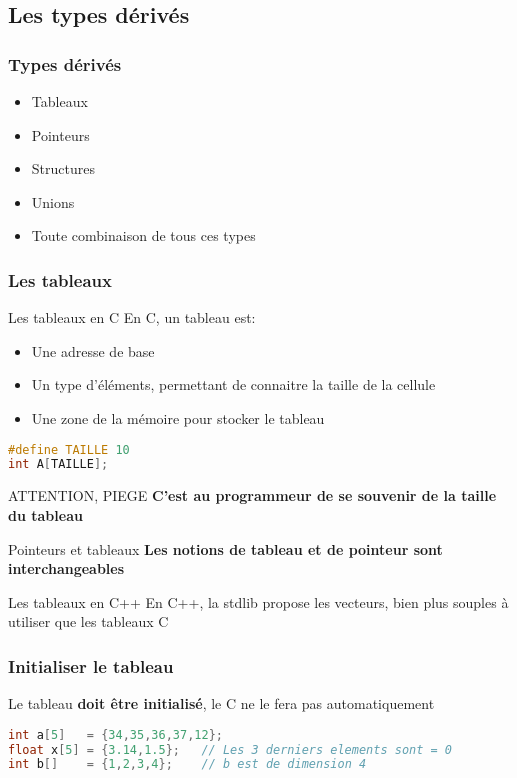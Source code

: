 \documentclass{beamer}
\begin{document}
\subsection{Les types dérivés}

\begin{frame}
\frametitle {Types dérivés}
\begin{itemize}
\item{Tableaux}
\item{Pointeurs}
\item{Structures}
\item{Unions}
\item{Toute combinaison de tous ces types}
\end{itemize}
\end{frame}

\begin{frame}[fragile=singleslide,shrink=20]
\frametitle{Les tableaux}
\begin{block}{Les tableaux en C}
En C, un tableau est:
\begin{itemize}
\item{Une adresse de base}
\item{Un type d'éléments, permettant de connaitre la taille de la cellule}
\item{Une zone de la mémoire pour stocker le tableau}
\end{itemize}
\end{block}
\begin{lstlisting}[language=c++]
#define TAILLE 10
int A[TAILLE];
\end{lstlisting}
\begin{block}{ATTENTION, PIEGE}
\textbf{C'est au programmeur de se souvenir de la taille du tableau}
\end{block}
\begin{block}{Pointeurs et tableaux}
\textbf{Les notions de tableau et de pointeur sont interchangeables}
\end{block}
\begin{block}{Les tableaux en C++}
En C++, la stdlib propose les vecteurs, bien plus souples à utiliser que les tableaux C
\end{block}
\end{frame}

\begin{frame}[fragile=singleslide,shrink=20]
\frametitle{Initialiser le tableau}
Le tableau \textbf{doit être initialisé}, le C ne le fera pas automatiquement
\begin{lstlisting}[language=c++]
int a[5]   = {34,35,36,37,12};
float x[5] = {3.14,1.5};   // Les 3 derniers elements sont = 0
int b[]    = {1,2,3,4};    // b est de dimension 4
\end{lstlisting}
\end{frame}
\end{document}
